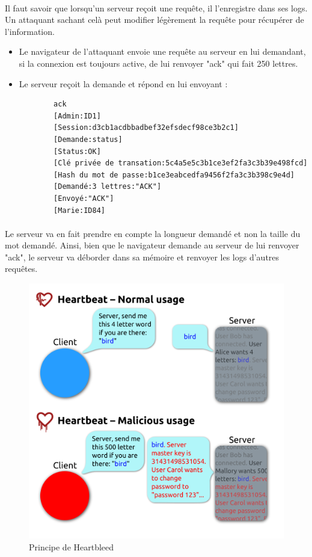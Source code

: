 \paragraph{}
Il faut savoir que lorsqu'un serveur reçoit une requête, il l'enregistre dans ses logs. Un attaquant sachant celà peut modifier légèrement la requête pour récupérer de l'information.
\begin{itemize}
  \item Le navigateur de l'attaquant envoie une requête au serveur en lui demandant, si la connexion est toujours active, de lui renvoyer "ack" qui fait 250 lettres.
  \item Le serveur reçoit la demande et répond en lui envoyant :
	\begin{verbatim}
		ack
		[Admin:ID1]
		[Session:d3cb1acdbbadbef32efsdecf98ce3b2c1]
		[Demande:status]
		[Status:OK]
		[Clé privée de transation:5c4a5e5c3b1ce3ef2fa3c3b39e498fcd]
		[Hash du mot de passe:b1ce3eabcedfa9456f2fa3c3b398c9e4d]
		[Demandé:3 lettres:"ACK"]
		[Envoyé:"ACK"]
		[Marie:ID84]
	\end{verbatim}
\end{itemize}

\paragraph{}
Le serveur va en fait prendre en compte la longueur demandé et non la taille du mot demandé. Ainsi, bien que le navigateur demande au serveur de lui renvoyer "ack", le serveur va déborder dans sa mémoire et renvoyer les logs d'autres requêtes.\\

\begin{figure}[h]
\label{fig:Heartbleed}
\centering
\includegraphics[scale=0.2]{Heartbleed}
\caption{Principe de Heartbleed}
\end{figure}

